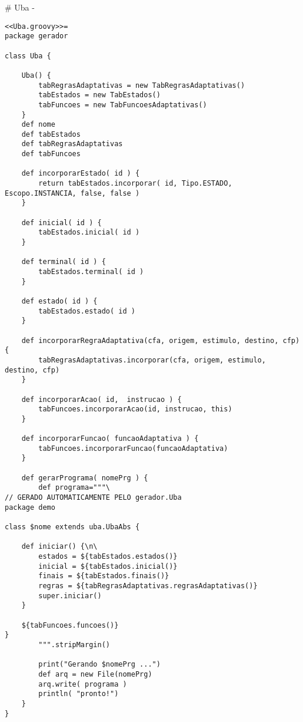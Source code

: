 # Uba {-}

\begin{lstlisting}
<<Uba.groovy>>=
package gerador

class Uba {

    Uba() {
        tabRegrasAdaptativas = new TabRegrasAdaptativas()
        tabEstados = new TabEstados()
        tabFuncoes = new TabFuncoesAdaptativas()
    }
    def nome
    def tabEstados
    def tabRegrasAdaptativas
    def tabFuncoes

    def incorporarEstado( id ) {
        return tabEstados.incorporar( id, Tipo.ESTADO, Escopo.INSTANCIA, false, false )
    }

    def inicial( id ) {
        tabEstados.inicial( id )
    }

    def terminal( id ) {
        tabEstados.terminal( id )
    }

    def estado( id ) {
        tabEstados.estado( id )
    }

    def incorporarRegraAdaptativa(cfa, origem, estimulo, destino, cfp) {
        tabRegrasAdaptativas.incorporar(cfa, origem, estimulo, destino, cfp)
    }

    def incorporarAcao( id,  instrucao ) {
        tabFuncoes.incorporarAcao(id, instrucao, this)
    }

    def incorporarFuncao( funcaoAdaptativa ) {
        tabFuncoes.incorporarFuncao(funcaoAdaptativa)
    }

    def gerarPrograma( nomePrg ) {
        def programa="""\
// GERADO AUTOMATICAMENTE PELO gerador.Uba
package demo

class $nome extends uba.UbaAbs {

    def iniciar() {\n\
        estados = ${tabEstados.estados()}
        inicial = ${tabEstados.inicial()}
        finais = ${tabEstados.finais()}
        regras = ${tabRegrasAdaptativas.regrasAdaptativas()}
        super.iniciar()
    }

    ${tabFuncoes.funcoes()}
}
        """.stripMargin()

        print("Gerando $nomePrg ...")
        def arq = new File(nomePrg)
        arq.write( programa )
        println( "pronto!")
    }
}
\end{lstlisting}



